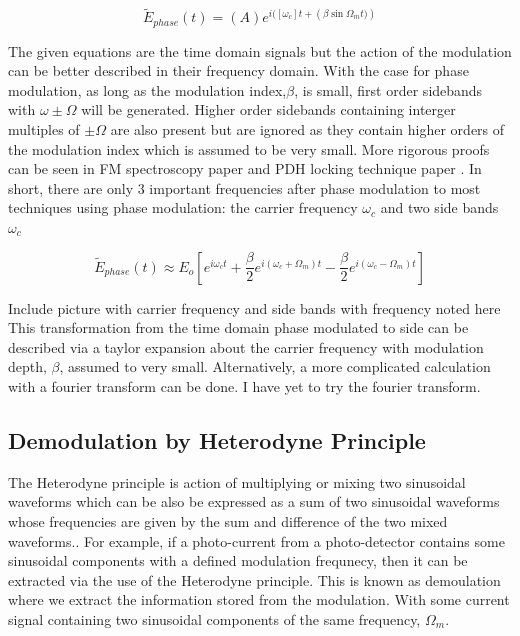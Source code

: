 \documentclass[11pt,a4paper]{book}
\begin{document}
			\begin{equation}
				\tilde{E}_{phase}(t)=\left(A\right)e^{i(\left[\omega_c \right] t + \left(\beta \sin{\Omega_m t})\right)}
			\end{equation}	
				
			The given equations are the time domain signals but the action of the modulation can be better described in their frequency domain. With the case for phase modulation, as long as the modulation index,$\beta$, is small, first order sidebands with $\omega \pm \Omega $ will be generated. Higher order sidebands containing interger multiples of $\pm \Omega$ are also present but are ignored as they contain higher orders of the modulation index which is assumed to be very small. More rigorous proofs can be seen in FM spectroscopy paper \cite{FMspec} and PDH locking technique paper \cite{PDH Intro}. In short, there are only 3 important frequencies after phase modulation to most techniques using phase modulation: the carrier frequency $\omega_c$ and two side bands $\omega_c$ 
			
			\begin{equation}
				\tilde{E}_{phase}(t)\approx E_o [e^{i\omega_c t}   +   \dfrac{\beta}{2} e^{i(\omega_c +\Omega_m)t}  -  \dfrac{\beta}{2} e^{i(\omega_c -\Omega_m)t}]
			\end{equation}
			
			Include picture with carrier frequency and side bands with frequency noted here
			This transformation from the time domain phase modulated to side can be described via a taylor expansion about the carrier frequency with modulation depth, $\beta$, assumed to very small. Alternatively, a more complicated calculation with a fourier transform can be done. I have yet to try the fourier transform.

		\subsection{Demodulation by Heterodyne Principle}
			\label{subsec:Demodulation by Heterodyne Principle}
			The Heterodyne principle is action of multiplying or mixing two sinusoidal waveforms which can be also be expressed as a sum of two sinusoidal waveforms whose frequencies are given by the sum and difference of the two mixed waveforms.\cite{MITModulation}. For example, if a photo-current from a photo-detector contains some sinusoidal components with a defined modulation frequnecy, then it can be extracted via the use of the Heterodyne principle. This is known as demoulation where we extract the information stored from the modulation. With some current signal containing two sinusoidal components of the same frequency, $\Omega_m$.
						
\end{document}
